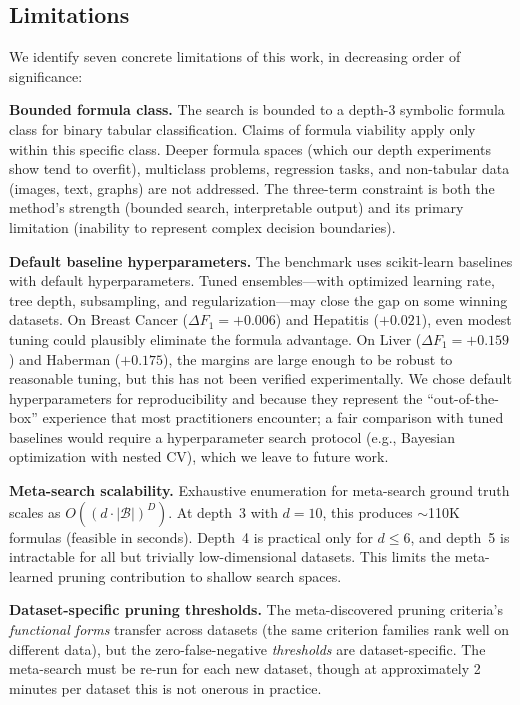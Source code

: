 \documentclass[journal]{IEEEtran}
\begin{document}
\subsection{Limitations}
\label{sec:limitations}

We identify seven concrete limitations of this work, in decreasing
order of significance:

\textbf{Bounded formula class.}
The search is bounded to a depth-3 symbolic formula class for binary
tabular classification.  Claims of formula viability apply only
within this specific class.  Deeper formula spaces (which our depth
experiments show tend to overfit), multiclass problems, regression
tasks, and non-tabular data (images, text, graphs) are not
addressed.  The three-term constraint is both the method's strength
(bounded search, interpretable output) and its primary limitation
(inability to represent complex decision boundaries).

\textbf{Default baseline hyperparameters.}
The benchmark uses scikit-learn baselines with default
hyperparameters.  Tuned ensembles---with optimized learning rate,
tree depth, subsampling, and regularization---may close the gap on
some winning datasets.  On Breast Cancer ($\Delta F_1 = +0.006$)
and Hepatitis ($+0.021$), even modest tuning could plausibly
eliminate the formula advantage.  On Liver ($\Delta F_1 = +0.159$)
and Haberman ($+0.175$), the margins are large enough to be robust
to reasonable tuning, but this has not been verified experimentally.
We chose default hyperparameters for reproducibility and because
they represent the ``out-of-the-box'' experience that most
practitioners encounter; a fair comparison with tuned baselines
would require a hyperparameter search protocol (e.g., Bayesian
optimization with nested CV), which we leave to future work.

\textbf{Meta-search scalability.}
Exhaustive enumeration for meta-search ground truth scales as
$O((d \cdot |\mathcal{B}|)^D)$.  At depth~3 with $d = 10$,
this produces $\sim$110K formulas (feasible in seconds).  Depth~4
is practical only for $d \leq 6$, and depth~5 is intractable for
all but trivially low-dimensional datasets.  This limits the
meta-learned pruning contribution to shallow search spaces.

\textbf{Dataset-specific pruning thresholds.}
The meta-discovered pruning criteria's \emph{functional forms}
transfer across datasets (the same criterion families rank well on
different data), but the zero-false-negative \emph{thresholds} are
dataset-specific.  The meta-search must be re-run for each new
dataset, though at approximately 2 minutes per dataset this is
not onerous in practice.
\end{document}

